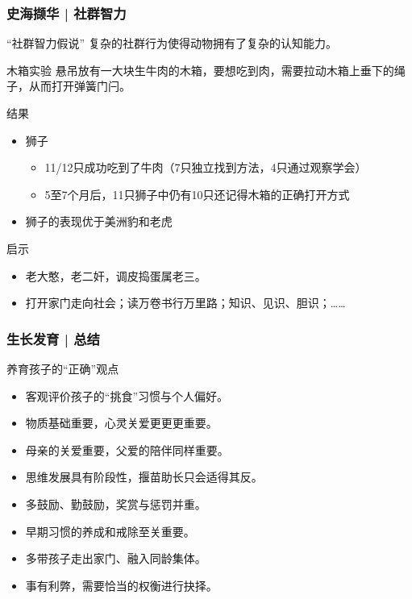 \begin{frame}
  \frametitle{史海撷华 | 社群智力}
  \vspace{-0.5em}
  \begin{block}{“社群智力假说”}
    复杂的社群行为使得动物拥有了复杂的认知能力。
  \end{block}
  \vspace{-0.5em}
  \pause
  \begin{block}{木箱实验}
    悬吊放有一大块生牛肉的木箱，要想吃到肉，需要拉动木箱上垂下的绳子，从而打开弹簧门闩。
  \end{block}
  \vspace{-0.5em}
  \pause
  \begin{block}{结果}
    \begin{itemize}
      \item 狮子
        \begin{itemize}
          \item 11/12只成功吃到了牛肉（7只独立找到方法，4只通过观察学会）
          \item 5至7个月后，11只狮子中仍有10只还记得木箱的正确打开方式
        \end{itemize}
      \item 狮子的表现优于美洲豹和老虎
    \end{itemize}
  \end{block}
  \vspace{-0.5em}
  \pause
  \begin{block}{启示}
    \begin{itemize}
      \item 老大憨，老二奸，调皮捣蛋属老三。
      \item 打开家门走向社会；读万卷书行万里路；知识、见识、胆识；……
    \end{itemize}
  \end{block}
\end{frame}

\begin{frame}
  \frametitle{生长发育 | 总结}
  \begin{block}{养育孩子的“正确”观点}
    \begin{itemize}
      \item 客观评价孩子的“挑食”习惯与个人偏好。
      \item 物质基础重要，心灵关爱更更更重要。
      \item 母亲的关爱重要，父爱的陪伴同样重要。
      \item 思维发展具有阶段性，揠苗助长只会适得其反。
      \item 多鼓励、勤鼓励，奖赏与惩罚并重。
      \item 早期习惯的养成和戒除至关重要。
      \item 多带孩子走出家门、融入同龄集体。
      \item 事有利弊，需要恰当的权衡进行抉择。
    \end{itemize}
  \end{block}
\end{frame}



